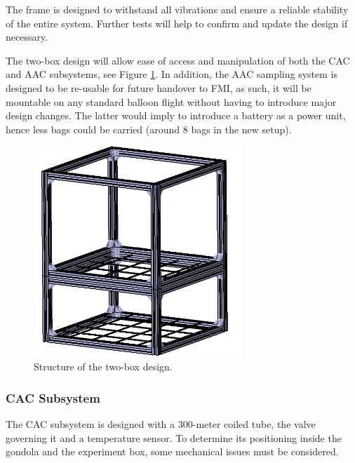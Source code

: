 The frame is designed to withstand all vibrations and ensure a reliable stability of the entire system. Further tests will help to confirm and update the design if necessary. 

The two-box design will allow ease of access and manipulation of both the CAC and AAC subsystems, see Figure \ref{strucutre}. In addition, the AAC sampling system is designed to be re-usable for future handover to FMI, as such, it will be mountable on any standard balloon flight without having to introduce major design changes. The latter would imply to introduce a battery as a power unit, hence less bags could be carried (around 8 bags in the new setup).

\begin{figure}[!ht]
    \centering
    \includegraphics[width=0.7\textwidth, angle=90]{4-experiment-design/img/frame_structure.jpg}
    \caption{Structure of the two-box design.}
    \label{strucutre}
\end{figure}

\subsubsection{CAC Subsystem}

The CAC subsystem is designed with a 300-meter coiled tube, the valve governing it and a temperature sensor. To determine its positioning inside the gondola and the experiment box, some mechanical issues must be considered.

